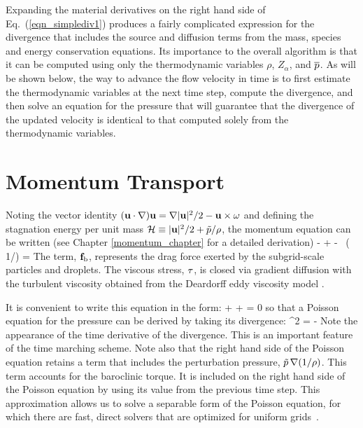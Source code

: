 Expanding the material derivatives on the right hand side of Eq.~(\ref{eqn_simplediv1}) produces a fairly complicated expression for
the divergence that includes the source and diffusion terms from the mass, species and energy conservation equations. Its importance to the overall algorithm is that it can be computed using only the thermodynamic variables $\rho$, $Z_\alpha$, and $\overline{p}$. As will be shown below, the way to advance the flow velocity in time is to first estimate the thermodynamic variables at the next time step, compute the divergence, and then solve an equation for the pressure that will guarantee that the divergence of the updated velocity is identical to that computed solely from the thermodynamic variables.



\section{Momentum Transport}

Noting the vector identity $({\mathbf{u}} \cdot \nabla) {\mathbf{u}} = \nabla|{\mathbf{u}}|^2/2 - {\mathbf{u}}\times{\mathbf{\omega}} $ and defining the stagnation energy per unit mass $\mathcal{H} \equiv |{\mathbf{u}}|^2/2 + \tilde{p}/\rho$, the momentum equation can be written (see Chapter \ref{momentum_chapter} for a detailed derivation)
\be
    - \bu\times\bo + \nabla \calH - \tp \, \nabla \left( 1/\rho\right) =  
\ee
The term, ${\mathbf{f}}_\text{b}$, represents the drag force exerted by the subgrid-scale particles and droplets. The viscous stress, $\mathbf{\tau}$, is closed via gradient diffusion with the turbulent viscosity obtained from the Deardorff eddy viscosity model \cite{Deardorff:1980,Pope:2000}.

It is convenient to write this equation in the form:
\be {} + \bF + \nabla \cH = 0  \ee
so that a Poisson equation for the pressure can be derived by taking its divergence:
\be \nabla^2 \calH = -    \label{simplephi2} \ee
Note the appearance of the time derivative of the divergence. This is an important feature of the time marching scheme. Note also that the right hand side of the Poisson equation retains a term that includes the perturbation pressure, $\tilde{p} \, \nabla (1/\rho)$. This term accounts for the baroclinic torque. It is included on the right hand side of the Poisson equation by using its value from the previous time step. This approximation allows us to solve a separable form of the Poisson equation, for which there are fast, direct solvers that are optimized for uniform grids~\cite{Sweet:1}.

